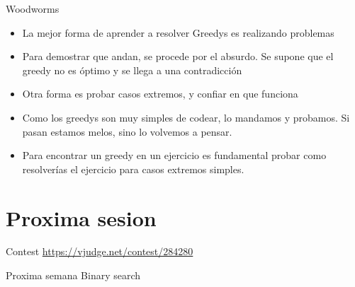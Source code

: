 \documentclass{beamer}
\begin{document}
\begin{frame}{Woodworms}
  \begin{itemize}
    \item La mejor forma de aprender a resolver Greedys es realizando
      problemas
    \item Para demostrar que andan, se procede por el absurdo. Se supone
      que el greedy no es óptimo y se llega a una contradicción
    \item Otra forma es probar casos extremos, y confiar en que funciona
    \item Como los greedys son muy simples de codear, lo mandamos y
      probamos. Si pasan estamos melos, sino lo volvemos a pensar.
    \item Para encontrar un greedy en un ejercicio es fundamental probar
      como resolverías el ejercicio para casos extremos simples.
  \end{itemize}
\end{frame}

\section{Proxima sesion}
\begin{frame}{Contest}
  \centering
  \url{https://vjudge.net/contest/284280}
\end{frame}

\begin{frame}{Proxima semana}
  \centering 
  \Large
  Binary search
\end{frame}
\end{document}
